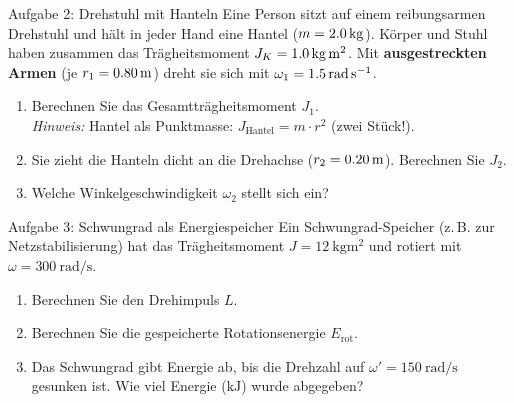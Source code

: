 \documentclass[11pt,a4paper,parskip=half]{scrartcl}
\begin{document}
\vspace{20pt}

\begin{aufgabebox}{Aufgabe 2: Drehstuhl mit Hanteln}
Eine Person sitzt auf einem reibungsarmen Drehstuhl und h\"alt in jeder Hand
eine Hantel ($m = \SI{2{,}0}{\kilogram}$). K\"orper und Stuhl haben zusammen
das Tr\"agheitsmoment $J_K = \SI{1{,}0}{\kilogram\metre\squared}$.
Mit \textbf{ausgestreckten Armen} (je $r_1 = \SI{0{,}80}{\metre}$) dreht sie sich
mit $\omega_1 = \SI{1{,}5}{\radian\per\second}$.

\begin{enumerate}[label=\alph*), leftmargin=1.5em, itemsep=1pt]
  \item Berechnen Sie das Gesamttr\"agheitsmoment $J_1$.\\
        \textit{Hinweis:}\; Hantel als Punktmasse: $J_{\text{Hantel}} = m\cdot r^2$ (zwei St\"uck!).
  \item Sie zieht die Hanteln dicht an die Drehachse ($r_2 = \SI{0{,}20}{\metre}$).
        Berechnen Sie $J_2$.
  \item Welche Winkelgeschwindigkeit $\omega_2$ stellt sich ein?
\end{enumerate}
\end{aufgabebox}

\vspace{20pt}

\begin{aufgabebox}{Aufgabe 3: Schwungrad als Energiespeicher}
Ein Schwungrad-Speicher (z.\,B. zur Netzstabilisierung) hat das Tr\"agheitsmoment
$J = \SI{12}{\kilogram\metre\squared}$ und rotiert mit $\omega = \SI{300}{\radian\per\second}$.

\begin{enumerate}[label=\alph*), leftmargin=1.5em, itemsep=1pt]
  \item Berechnen Sie den Drehimpuls $L$.
  \item Berechnen Sie die gespeicherte Rotationsenergie $E_{\text{rot}}$.
  \item Das Schwungrad gibt Energie ab, bis die Drehzahl auf
        $\omega' = \SI{150}{\radian\per\second}$ gesunken ist.
        Wie viel Energie ($\si{\kilo\joule}$) wurde abgegeben?
\end{enumerate}
\end{aufgabebox}

\newpage
\end{document}
